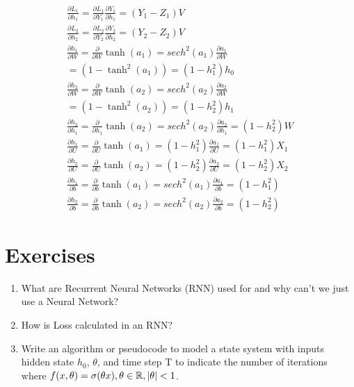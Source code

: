 \begin{example}
\begin{align*}
\frac{\partial L_1}{\partial h_1}=\frac{\partial L_1}{\partial Y_1}\frac{\partial Y_1}{\partial h_1}=(Y_1-Z_1)V\\[1em]
\frac{\partial L_2}{\partial h_2}=\frac{\partial L_2}{\partial Y_2}\frac{\partial Y_2}{\partial h_2}=(Y_2-Z_2)V\\[1em]
\frac{\partial h_1}{\partial W}=\frac{\partial }{\partial W} \tanh (a_1)=sech^2(a_1)\frac{\partial a_1}{\partial W}\\
=(1-\tanh ^2(a_1))=(1-h_1^2)h_0\\[1em]
\frac{\partial h_2}{\partial W}=\frac{\partial }{\partial W} \tanh (a_2)=sech^2(a_2)\frac{\partial a_2}{\partial W}\\
=(1-\tanh ^2(a_2))=(1-h_2^2)h_1\\[1em]
\frac{\partial h_2}{\partial h_1}=\frac{\partial }{\partial h_1} \tanh (a_2)=sech^2(a_2)\frac{\partial a_2}{\partial h_1}=(1-h_2^2)W\\[1em]
\frac{\partial h_1}{\partial U}=\frac{\partial }{\partial U} \tanh (a_1)=(1-h_1^2)\frac{\partial a_1}{\partial U}=(1-h_1^2)X_1\\[1em]
\frac{\partial h_2}{\partial U}=\frac{\partial }{\partial U} \tanh (a_2)=(1-h_2^2)\frac{\partial a_2}{\partial U}=(1-h_2^2)X_2\\[1em]
\frac{\partial h_1}{\partial b}=\frac{\partial }{\partial b}\tanh (a_1)=sech^2(a_1)\frac{\partial a_1}{\partial b}=(1-h_1^2)\\[1em]
\frac{\partial h_2}{\partial b}=\frac{\partial }{\partial b}\tanh (a_2)=sech^2(a_2)\frac{\partial a_2}{\partial b}=(1-h_2^2)
\end{align*}
\end{example}

\section{Exercises}
\begin{enumerate}
    \item What are Recurrent Neural Networks (RNN) used for and why can't we just use a Neural Network?
            
    \item How is Loss calculated in an RNN?
    
    \item Write an algorithm or pseudocode to model a state system with inputs hidden state $h_0$, $\theta$, and time step T to indicate the number of iterations where $f(x,\theta) = \sigma(\theta x), \theta \in \R,  |\theta| < 1$.\\
    
      
\end{enumerate}



